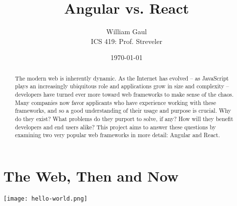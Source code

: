 \documentclass[12pt,letterpaper]{article}
\title{\textbf{Angular vs. React}}
\author{William Gaul\\{ICS 419: Prof. Streveler}}
\date{\today}
\begin{document}
\maketitle

\renewcommand{\abstractname}{Executive Summary}
\begin{singlespace*}
\begin{abstract}
	The modern web is inherently dynamic. As the Internet has evolved -- as JavaScript plays an increasingly ubiquitous role and applications grow in size and complexity -- developers have turned ever more toward web frameworks to make sense of the chaos. Many companies now favor applicants who have experience working with these frameworks, and so a good understanding of their usage and purpose is crucial. Why do they exist? What problems do they purport to solve, if any? How will they benefit developers and end users alike? This project aims to answer these questions by examining two very popular web frameworks in more detail: Angular and React.
\end{abstract}
\end{singlespace*}

\section{The Web, Then and Now}

\cite{Schlensker:2014}
\cite{Angular:Docs}
\cite{Hunt:2013}
\cite{Green:2013}
\cite{Hunt:2014}

\texttt{[image: hello-world.png]}

\end{document}
